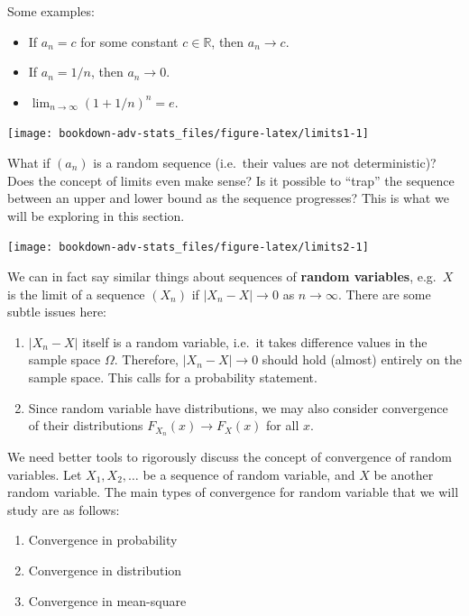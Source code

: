 \documentclass[
]{book}
\providecommand{\tightlist}{%
  \setlength{\itemsep}{0pt}\setlength{\parskip}{0pt}}
\newcommand{\bbR}{\mathbb{R}}
\theoremstyle{definition}
\theoremstyle{definition}
\theoremstyle{definition}
\theoremstyle{definition}
\theoremstyle{remark}
\begin{document}
Some examples:

\begin{itemize}
\tightlist
\item
  If \(a_n=c\) for some constant \(c\in\bbR\), then \(a_n\to c\).
\item
  If \(a_n=1/n\), then \(a_n\to 0\).
\item
  \(\lim_{n\to\infty}(1+1/n)^n = e\).
\end{itemize}

\begin{center}\texttt{[image: bookdown-adv-stats\_files/figure-latex/limits1-1]} \end{center}

What if \((a_n)\) is a random sequence (i.e.~their values are not deterministic)?
Does the concept of limits even make sense?
Is it possible to ``trap'' the sequence between an upper and lower bound as the sequence progresses?
This is what we will be exploring in this section.

\begin{center}\texttt{[image: bookdown-adv-stats\_files/figure-latex/limits2-1]} \end{center}

We can in fact say similar things about sequences of \textbf{random variables}, e.g.~\(X\) is the limit of a sequence
\((X_n)\) if \(|X_n - X|\to 0\) as \(n\to\infty\).
There are some subtle issues here:

\begin{enumerate}
\def\labelenumi{\arabic{enumi}.}
\item
  \(|X_n-X|\) itself is a random variable, i.e.~it takes difference values in the
  sample space \(\Omega\). Therefore, \(|X_n - X|\to 0\) should hold
  (almost) entirely on the sample space. This calls for a probability
  statement.
\item
  Since random variable have distributions, we may also consider convergence of
  their distributions \(F_{X_n}(x)\to F_X(x)\) for all \(x\).
\end{enumerate}

We need better tools to rigorously discuss the concept of convergence of random variables.
Let \(X_1,X_2,\dots\) be a sequence of random variable, and \(X\)
be another random variable. The main types of convergence for random variable that we will study are as follows:

\begin{enumerate}
\def\labelenumi{\arabic{enumi}.}
\tightlist
\item
  Convergence in probability
\item
  Convergence in distribution
\item
  Convergence in mean-square
\end{enumerate}
\end{document}
